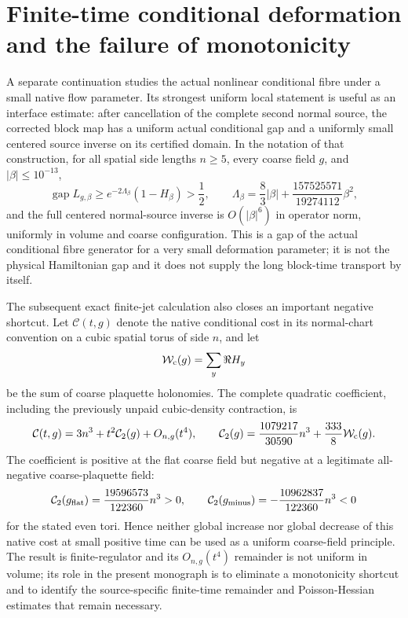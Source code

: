 \documentclass[11pt,oneside,openany]{book}
\theoremstyle{definition}
\theoremstyle{remark}
\newcommand{\gap}{\operatorname{gap}}
\newcommand{\src}[2]{\cite[#2]{#1}}
\begin{document}
\section{Finite-time conditional deformation and the failure of monotonicity}
\label{sec:native-finite-time-deformation}
A separate continuation studies the actual nonlinear conditional fibre
under a small native flow parameter.  Its strongest uniform local
statement is useful as an interface estimate: after cancellation of the
complete second normal source, the corrected block map has a uniform
actual conditional gap and a uniformly small centered source inverse
on its certified domain.  In the notation of that construction, for
all spatial side lengths $n\ge5$, every coarse field $g$, and
$|\beta|\le10^{-13}$,
\begin{equation}\label{eq:native-conditional-gap-late}
 \gap L_{g,\beta}
 \ge e^{-2\Lambda_\beta}(1-H_\beta)>\frac12,
 \qquad
 \Lambda_\beta=\frac83|\beta|+
       \frac{157525571}{19274112}\beta^2,
\end{equation}
and the full centered normal-source inverse is $O(|\beta|^6)$ in
operator norm, uniformly in volume and coarse configuration.
\src{F18}{V48--V49}  This is a gap of the actual conditional fibre
generator for a very small deformation parameter; it is not the
physical Hamiltonian gap and it does not supply the long block-time
transport by itself.

The subsequent exact finite-jet calculation also closes an important
negative shortcut.  Let $\mathcal C(t,g)$ denote the native conditional
cost in its normal-chart convention on a cubic spatial torus of side
$n$, and let
\begin{equation}\label{eq:native-coarse-W}
 \mathcal W_{\rm c}(g)=\sum_y\Re H_y
\end{equation}
be the sum of coarse plaquette holonomies.  The complete quadratic
coefficient, including the previously unpaid cubic-density contraction,
is
\begin{equation}\label{eq:native-cost-C2}
 \mathcal C(t,g)=3n^3+t^2\mathcal C_2(g)+O_{n,g}(t^4),
 \qquad
 \mathcal C_2(g)=\frac{1079217}{30590}n^3+
                         \frac{333}{8}\mathcal W_{\rm c}(g).
\end{equation}
The coefficient is positive at the flat coarse field but negative at a
legitimate all-negative coarse-plaquette field:
\begin{equation}\label{eq:native-cost-signs}
 \mathcal C_2(g_{\rm flat})=
       \frac{19596573}{122360}n^3>0,
 \qquad
 \mathcal C_2(g_{\rm minus})=
      -\frac{10962837}{122360}n^3<0
\end{equation}
for the stated even tori.  \src{F18}{V59}
Hence neither global increase nor global decrease of this native cost
at small positive time can be used as a uniform coarse-field principle.
The result is finite-regulator and its $O_{n,g}(t^4)$ remainder is not
uniform in volume; its role in the present monograph is to eliminate a
monotonicity shortcut and to identify the source-specific finite-time
remainder and Poisson-Hessian estimates that remain necessary.
\end{document}
